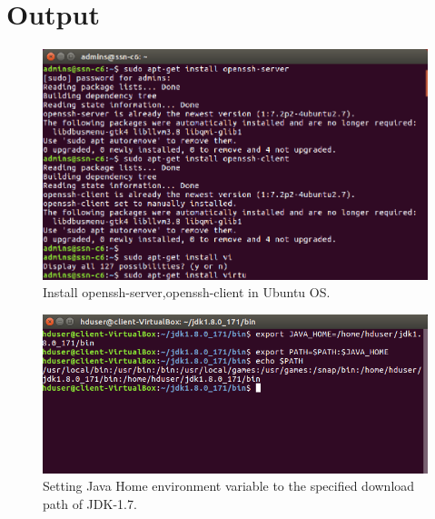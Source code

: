 \documentclass[a4paper,10pt]{article}
\begin{document}
\section{Output}
\begin{figure}[h]
	\includegraphics[scale=0.30,center]{exptFourScreenShot/fig1.png}
	\caption{Install openssh-server,openssh-client in Ubuntu OS.}
	\label{fig:1}
	
\end{figure}
\begin{figure}[h]
	\includegraphics[scale=0.34,center]{exptFourScreenShot/fig2.png}
	\caption{Setting Java Home environment variable to the specified download path of JDK-1.7.}
	\label{fig:2}
\end{figure}
\end{document}

